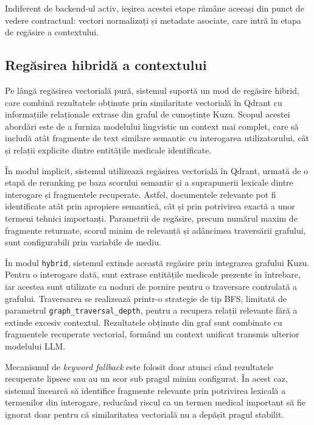 \documentclass[12pt, a4paper, oneside, romanian]{teza-upb}
\begin{document}
Indiferent de backend-ul activ, ieșirea acestei etape rămâne aceeași din punct de vedere contractual: vectori normalizați și metadate asociate, care intră în etapa de regăsire a contextului.


\subsection{Regăsirea hibridă a contextului}

Pe lângă regăsirea vectorială pură, sistemul suportă un mod de regăsire hibrid, care combină rezultatele obținute prin similaritate vectorială în Qdrant cu informațiile relaționale extrase din graful de cunoștințe Kuzu. Scopul acestei abordări este de a furniza modelului lingvistic un context mai complet, care să includă atât fragmente de text similare semantic cu interogarea utilizatorului, cât și relații explicite dintre entitățile medicale identificate.

În modul implicit, sistemul utilizează regăsirea vectorială în Qdrant, urmată de o etapă de reranking pe baza scorului semantic și a suprapunerii lexicale dintre interogare și fragmentele recuperate. Astfel, documentele relevante pot fi identificate atât prin apropiere semantică, cât și prin potrivirea exactă a unor termeni tehnici importanți. Parametrii de regăsire, precum numărul maxim de fragmente returnate, scorul minim de relevanță și adâncimea traversării grafului, sunt configurabili prin variabile de mediu.

În modul \texttt{hybrid}, sistemul extinde această regăsire prin integrarea grafului Kuzu. Pentru o interogare dată, sunt extrase entitățile medicale prezente în întrebare, iar acestea sunt utilizate ca noduri de pornire pentru o traversare controlată a grafului. Traversarea se realizează printr-o strategie de tip BFS, limitată de parametrul \texttt{graph\_traversal\_depth}, pentru a recupera relații relevante fără a extinde excesiv contextul. Rezultatele obținute din graf sunt combinate cu fragmentele recuperate vectorial, formând un context unificat transmis ulterior modelului LLM.

Mecanismul de \textit{keyword fallback} este folosit doar atunci când rezultatele recuperate lipsesc sau au un scor sub pragul minim configurat. În acest caz, sistemul încearcă să identifice fragmente relevante prin potrivirea lexicală a termenilor din interogare, reducând riscul ca un termen medical important să fie ignorat doar pentru că similaritatea vectorială nu a depășit pragul stabilit.
\end{document}
